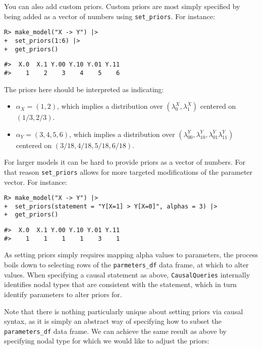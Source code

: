 \documentclass[
  11pt,
  article]{jss}
\providecommand{\tightlist}{%
  \setlength{\itemsep}{0pt}\setlength{\parskip}{0pt}}\usepackage{longtable,booktabs,array}
\begin{document}
You can also add custom priors. Custom priors are most simply specified
by being added as a vector of numbers using \texttt{set\_priors}. For
instance:

\begin{verbatim}
R> make_model("X -> Y") |> 
+  set_priors(1:6) |> 
+  get_priors()
\end{verbatim}

\begin{verbatim}
#>  X.0  X.1 Y.00 Y.10 Y.01 Y.11 
#>    1    2    3    4    5    6
\end{verbatim}

The priors here should be interpreted as indicating:

\begin{itemize}
\tightlist
\item
  \(\alpha_X = (1,2)\), which implies a distribution over
  \((\lambda^X_0, \lambda^X_1)\) centered on \((1/3, 2/3)\).
\item
  \(\alpha_Y = (3,4,5,6)\), which implies a distribution over
  \((\lambda^Y_{00}, \lambda^Y_{10}, \lambda^Y_{01} \lambda^Y_{11})\)
  centered on \((3/18, 4/18, 5/18, 6/18)\).
\end{itemize}

For larger models it can be hard to provide priors as a vector of
numbers. For that reason \texttt{set\_priors} allows for more targeted
modifications of the parameter vector. For instance:

\begin{verbatim}
R> make_model("X -> Y") |>
+  set_priors(statement = "Y[X=1] > Y[X=0]", alphas = 3) |>
+  get_priors()
\end{verbatim}

\begin{verbatim}
#>  X.0  X.1 Y.00 Y.10 Y.01 Y.11 
#>    1    1    1    1    3    1
\end{verbatim}

As setting priors simply requires mapping alpha values to parameters,
the process boils down to selecting rows of the \texttt{parmeters\_df}
data frame, at which to alter values. When specifying a causal statement
as above, \texttt{CausalQueries} internally identifies nodal types that
are consistent with the statement, which in turn identify parameters to
alter priors for.

Note that there is nothing particularly unique about setting priors via
causal syntax, as it is simply an abstract way of specifying how to
subset the \texttt{parameters\_df} data frame. We can achieve the same
result as above by specifying nodal type for which we would like to
adjust the priors:
\end{document}
